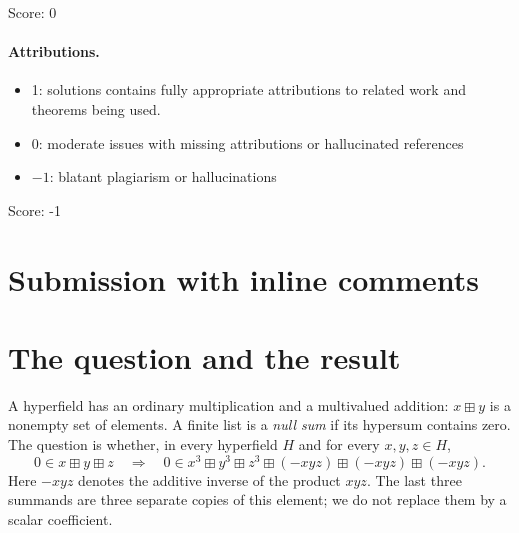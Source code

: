 \documentclass[11pt]{article}
\theoremstyle{remark}
\newcommand{\hs}{\boxplus}
\begin{document}
\noindent Score: 0

\paragraph{Attributions.}
\begin{itemize}
	\item  1: solutions contains fully appropriate attributions
		to related work and theorems being used.
	\item  0: moderate issues with missing attributions or hallucinated references
	\item  $-1$: blatant plagiarism or hallucinations
\end{itemize}

\noindent Score: -1

\newpage
\section{Submission with inline comments}


\begin{abstract}
Over a field, a triple with sum zero satisfies the identity
$x^3+y^3+z^3=3xyz$. We show that the corresponding implication for
hyperaddition fails in general, even when the three copies of $-xyz$ are
kept as separate summands. We construct a countably infinite hyperfield
with infinite cyclic multiplicative group in which $(1,g,g^4)$ is a
counterexample. The construction uses translates of a subset of the
integers representing each nonzero integer uniquely as an ordered
difference. We prove the required incidence properties and all
hyperfield axioms directly. We also prove that the implication holds
for quotients of fields, for triples with a singleton pairwise
hypersum, and, under $-1=1$, for triples with equal squares.
\end{abstract}

\section{The question and the result}

A hyperfield has an ordinary multiplication and a multivalued addition:
$x\hs y$ is a nonempty set of elements. A finite list is a
\emph{null sum} if its hypersum contains zero. The question is whether,
in every hyperfield $H$ and for every $x,y,z\in H$,
\begin{equation}\label{eq:question}
 0\in x\hs y\hs z
 \quad\Longrightarrow\quad
 0\in x^3\hs y^3\hs z^3\hs(-xyz)\hs(-xyz)\hs(-xyz).
\end{equation}
Here $-xyz$ denotes the additive inverse of the product $xyz$.
The last three summands are three separate copies of this element;
we do not replace them by a scalar coefficient.
\end{document}
